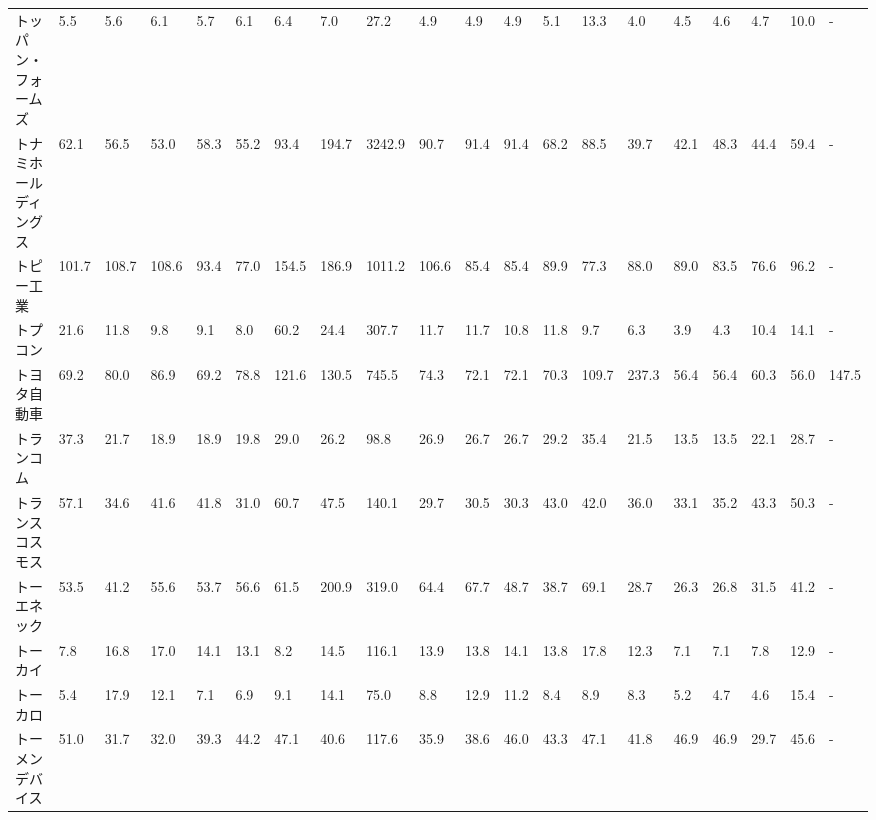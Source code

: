 \begin{longtable}[c]{lp{3mm}p{3mm}p{3mm}p{3mm}p{3mm}p{3mm}p{3mm}p{3mm}p{3mm}p{3mm}p{3mm}p{3mm}p{3mm}p{3mm}p{3mm}p{3mm}p{3mm}p{3mm}p{3mm}}
トッパン・フォームズ      &    5.5 &    5.6 &       6.1 &       5.7 &        6.1 &     6.4 &     7.0 &     27.2 &     4.9 &     4.9 &    4.9 &    5.1 &    13.3 &     4.0 &     4.5 &    4.6 &    4.7 &    10.0 &      - \\
トナミホールディングス     &   62.1 &   56.5 &      53.0 &      58.3 &       55.2 &    93.4 &   194.7 &   3242.9 &    90.7 &    91.4 &   91.4 &   68.2 &    88.5 &    39.7 &    42.1 &   48.3 &   44.4 &    59.4 &      - \\
トピー工業           &  101.7 &  108.7 &     108.6 &      93.4 &       77.0 &   154.5 &   186.9 &   1011.2 &   106.6 &    85.4 &   85.4 &   89.9 &    77.3 &    88.0 &    89.0 &   83.5 &   76.6 &    96.2 &      - \\
トプコン            &   21.6 &   11.8 &       9.8 &       9.1 &        8.0 &    60.2 &    24.4 &    307.7 &    11.7 &    11.7 &   10.8 &   11.8 &     9.7 &     6.3 &     3.9 &    4.3 &   10.4 &    14.1 &      - \\
トヨタ自動車          &   69.2 &   80.0 &      86.9 &      69.2 &       78.8 &   121.6 &   130.5 &    745.5 &    74.3 &    72.1 &   72.1 &   70.3 &   109.7 &   237.3 &    56.4 &   56.4 &   60.3 &    56.0 &  147.5 \\
トランコム           &   37.3 &   21.7 &      18.9 &      18.9 &       19.8 &    29.0 &    26.2 &     98.8 &    26.9 &    26.7 &   26.7 &   29.2 &    35.4 &    21.5 &    13.5 &   13.5 &   22.1 &    28.7 &      - \\
トランスコスモス        &   57.1 &   34.6 &      41.6 &      41.8 &       31.0 &    60.7 &    47.5 &    140.1 &    29.7 &    30.5 &   30.3 &   43.0 &    42.0 &    36.0 &    33.1 &   35.2 &   43.3 &    50.3 &      - \\
トーエネック          &   53.5 &   41.2 &      55.6 &      53.7 &       56.6 &    61.5 &   200.9 &    319.0 &    64.4 &    67.7 &   48.7 &   38.7 &    69.1 &    28.7 &    26.3 &   26.8 &   31.5 &    41.2 &      - \\
トーカイ            &    7.8 &   16.8 &      17.0 &      14.1 &       13.1 &     8.2 &    14.5 &    116.1 &    13.9 &    13.8 &   14.1 &   13.8 &    17.8 &    12.3 &     7.1 &    7.1 &    7.8 &    12.9 &      - \\
トーカロ            &    5.4 &   17.9 &      12.1 &       7.1 &        6.9 &     9.1 &    14.1 &     75.0 &     8.8 &    12.9 &   11.2 &    8.4 &     8.9 &     8.3 &     5.2 &    4.7 &    4.6 &    15.4 &      - \\
トーメンデバイス        &   51.0 &   31.7 &      32.0 &      39.3 &       44.2 &    47.1 &    40.6 &    117.6 &    35.9 &    38.6 &   46.0 &   43.3 &    47.1 &    41.8 &    46.9 &   46.9 &   29.7 &    45.6 &      - \\

\end{longtable}
